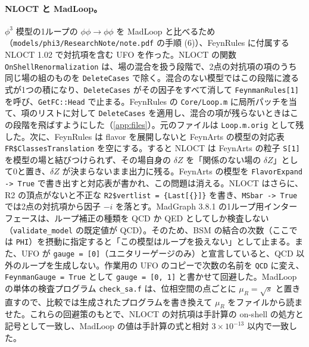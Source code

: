 \documentclass[a4paper,10pt]{ltjsarticle}
\begin{document}
\paragraph{NLOCT と MadLoop。}$\phi^3$ 模型の1ループの $\phi\phi\to\phi\phi$ を MadLoop と比べるため（\nolinkurl{models/phi3/ResearchNote/note.pdf} の手順 (6)）、FeynRules に付属する NLOCT 1.02 で対抗項を含む UFO を作った。NLOCT の関数 \texttt{OnShellRenormalization} は、場の混合を扱う段階で、2点の対抗項の項のうち同じ場の組のものを \texttt{DeleteCases} で除く。混合のない模型ではこの段階に渡る式が1つの積になり、\texttt{DeleteCases} がその因子をすべて消して \texttt{FeynmanRules[1]} を呼び、\texttt{GetFC::Head} で止まる。FeynRules の \texttt{Core/Loop.m} に局所パッチを当て、項のリストに対して \texttt{DeleteCases} を適用し、混合の項が残らないときはこの段階を飛ばすようにした（\ref{app:files}）。元のファイルは \texttt{Loop.m.orig} として残した。次に、FeynRules は flavor を展開しないと FeynArts の模型の対応表 \texttt{FR\$ClassesTranslation} を空にする。すると NLOCT は FeynArts の粒子 \texttt{S[1]} を模型の場と結びつけられず、その場自身の $\delta Z$ を「関係のない場の $\delta Z$」として0と置き、$\delta Z$ が決まらないまま出力に残る。FeynArts の模型を \texttt{FlavorExpand -> True} で書き出すと対応表が書かれ、この問題は消える。NLOCT はさらに、R2 の頂点がないと不正な \texttt{R2\$vertlist = \{Last[\{\}]\}} を書き、\texttt{MSbar -> True} では2点の対抗項から因子 $-i$ を落とす。MadGraph 3.8.1 の1ループ用インターフェースは、ループ補正の種類を QCD か QED としてしか検査しない（\texttt{validate\_model} の既定値が QCD）。そのため、BSM の結合の次数（ここでは \texttt{PHI}）を摂動に指定すると「この模型はループを扱えない」として止まる。また、UFO が \texttt{gauge = [0]}（ユニタリーゲージのみ）と宣言していると、QCD 以外のループを生成しない。作業用の UFO のコピーで次数の名前を \texttt{QCD} に変え、\texttt{FeynmanGauge = True} として \texttt{gauge = [0, 1]} と書かせて回避した。MadLoop の単体の検査プログラム \texttt{check\_sa.f} は、位相空間の点ごとに $\mu_R=\sqrt s$ と置き直すので、比較では生成されたプログラムを書き換えて $\mu_R$ をファイルから読ませた。これらの回避策のもとで、NLOCT の対抗項は手計算の on-shell の処方と記号として一致し、MadLoop の値は手計算の式と相対 $3\times10^{-13}$ 以内で一致した。
\end{document}

